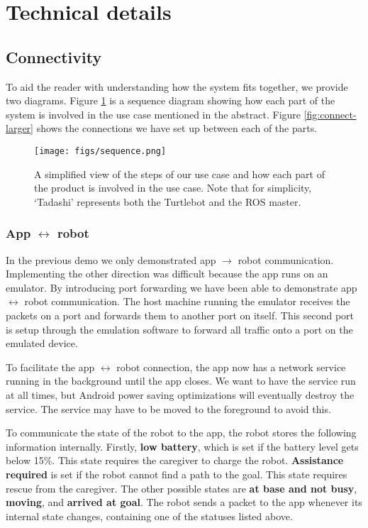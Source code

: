 \documentclass{article}
\begin{document}
\section{Technical details}
\subsection{Connectivity}
To aid the reader with understanding how the system fits together, we provide two diagrams. Figure \ref{fig:seq} is a sequence diagram showing how each part of the system is involved in the use case mentioned in the abstract. Figure \ref{fig:connect-larger} shows the connections we have set up between each of the parts. 

\begin{figure}
  \begin{center}
    \texttt{[image: figs/sequence.png]}
  \end{center}
  \caption{A simplified view of the steps of our use case and how each part of the product is involved in the use case. Note that for simplicity, `Tadashi' represents both the Turtlebot and the ROS master.}
  \label{fig:seq}
\end{figure}

\subsubsection{App $\leftrightarrow$ robot}
\label{approbot}
In the previous demo we only demonstrated app $\rightarrow$ robot communication. Implementing the other direction was difficult because the app runs on an emulator. By introducing port forwarding we have been able to demonstrate app $\leftrightarrow$ robot communication. The host machine running the emulator receives the packets on a port and forwards them to another port on itself. This second port is setup through the emulation software to forward all traffic onto a port on the emulated device.

To facilitate the app $\leftrightarrow$ robot connection, the app now has a network service running in the background until the app closes. We want to have the service run at all times, but Android power saving optimizations will eventually destroy the service. The service may have to be moved to the foreground to avoid this. 

To communicate the state of the robot to the app, the robot stores the following information internally. Firstly, {\bf low battery}, which is set if the battery level gets below 15\%. This state requires the caregiver to charge the robot. {\bf Assistance required} is set if the robot cannot find a path to the goal. This state requires rescue from the caregiver. The other possible states are {\bf at base and not busy}, {\bf moving}, and {\bf arrived at goal}. The robot sends a packet to the app whenever its internal state changes, containing one of the statuses listed above. 
\end{document}
